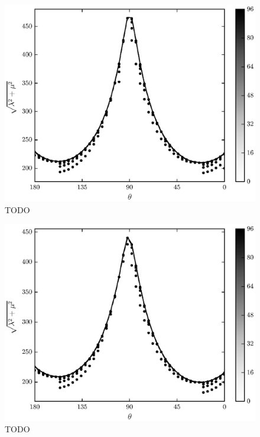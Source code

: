 	\begin{figure}[t]
		\begin{center}
			\includegraphics{./fig/ch3/pull/b10/grid.eps}
		\end{center}		
		\caption{ TODO
		\label{fig:PullGrid:b10}}
	\end{figure}
	
	\begin{figure}[t]
		\begin{center}
			\includegraphics{./fig/ch3/pull/b100/grid.eps}
		\end{center}		
		\caption{ TODO
		\label{fig:PullGrid:b100}}
	\end{figure}
	
